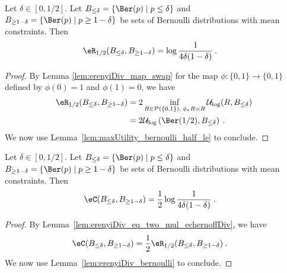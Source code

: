 \begin{lemma}\label{lem:erenyiDiv_bernoulli}
  \leanok
Let $\delta \in [0,1/2]$.
Let $B_{\le \delta} = \{\Ber(p) \mid p \le \delta\}$ and $B_{\ge 1 - \delta} = \{\Ber(p) \mid p \ge 1 - \delta\}$ be sets of Bernoulli distributions with mean constraints.
Then
\begin{align*}
  \eR_{1/2}(B_{\le \delta}, B_{\ge 1 - \delta})
  &= \log \frac{1}{4 \delta (1 - \delta)}
  \: .
\end{align*}
\end{lemma}

\begin{proof}\leanok
By Lemma \ref{lem:erenyiDiv_map_swap} for the map $\phi : \{0,1\} \to \{0,1\}$ defined by $\phi(0) = 1$ and $\phi(1) = 0$, we have
\begin{align*}
  \eR_{1/2}(B_{\le \delta}, B_{\ge 1 - \delta})
  &= 2 \inf_{R \in \mathcal{P}(\{0,1\}), \: \phi_* R = R} \mathcal{U}_{\log}(R, B_{\le \delta})
  \\
  &= 2 \mathcal{U}_{\log}\left(\Ber(1/2), B_{\le \delta}\right)
  \: .
\end{align*}
We now use Lemma~\ref{lem:maxUtility_bernoulli_half_le} to conclude.
\end{proof}


\begin{lemma}\label{lem:echernoffDiv_bernoulli}
  \leanok
Let $\delta \in [0,1/2]$.
Let $B_{\le \delta} = \{\Ber(p) \mid p \le \delta\}$ and $B_{\ge 1 - \delta} = \{\Ber(p) \mid p \ge 1 - \delta\}$ be sets of Bernoulli distributions with mean constraints.
Then
\begin{align*}
  \eC(B_{\le \delta}, B_{\ge 1 - \delta})
  &= \frac{1}{2} \log \frac{1}{4 \delta (1 - \delta)}
  \: .
\end{align*}
\end{lemma}

\begin{proof}\leanok
By Lemma~\ref{lem:erenyiDiv_eq_two_mul_echernoffDiv}, we have
\begin{align*}
  \eC(B_{\le \delta}, B_{\ge 1 - \delta})
  &= \frac{1}{2} \eR_{1/2}(B_{\le \delta}, B_{\ge 1 - \delta})
  \: .
\end{align*}
We now use Lemma~\ref{lem:erenyiDiv_bernoulli} to conclude.
\end{proof}


